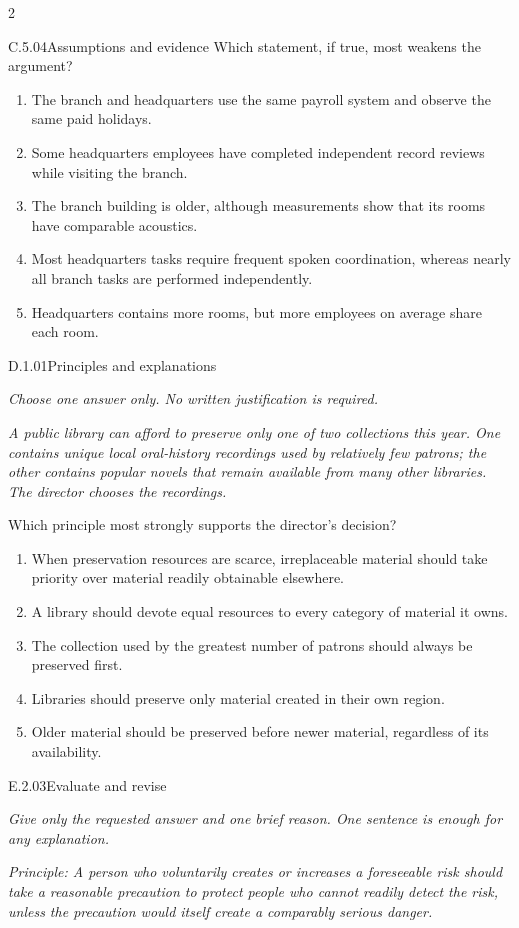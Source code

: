 \documentclass[9pt]{extarticle}
\newcommand{\choice}[1]{\item #1}
\begin{document}
\begin{multicols}{2}
\begin{DenseCoreProblem}{C.5.04}{Assumptions and evidence}
Which statement, if true, most weakens the argument?
\begin{enumerate}[label=(\alph*)]
  \choice{The branch and headquarters use the same payroll system and observe the same paid holidays.}
  \choice{Some headquarters employees have completed independent record reviews while visiting the branch.}
  \choice{The branch building is older, although measurements show that its rooms have comparable acoustics.}
  \choice{Most headquarters tasks require frequent spoken coordination, whereas nearly all branch tasks are performed independently.}
  \choice{Headquarters contains more rooms, but more employees on average share each room.}
\end{enumerate}
\end{DenseCoreProblem}
\begin{DenseCoreProblem}{D.1.01}{Principles and explanations}
{\scriptsize\textit{Choose one answer only. No written justification is required.}\par}
\emph{A public library can afford to preserve only one of two collections this year. One contains unique local oral-history recordings used by relatively few patrons; the other contains popular novels that remain available from many other libraries. The director chooses the recordings.}

Which principle most strongly supports the director's decision?
\begin{enumerate}[label=(\alph*)]
  \choice{When preservation resources are scarce, irreplaceable material should take priority over material readily obtainable elsewhere.}
  \choice{A library should devote equal resources to every category of material it owns.}
  \choice{The collection used by the greatest number of patrons should always be preserved first.}
  \choice{Libraries should preserve only material created in their own region.}
  \choice{Older material should be preserved before newer material, regardless of its availability.}
\end{enumerate}
\end{DenseCoreProblem}
\begin{DenseCoreProblem}{E.2.03}{Evaluate and revise}
{\scriptsize\textit{Give only the requested answer and one brief reason. One sentence is enough for any explanation.}\par}
\emph{Principle: A person who voluntarily creates or increases a foreseeable risk should take a reasonable precaution to protect people who cannot readily detect the risk, unless the precaution would itself create a comparably serious danger.}


\end{DenseCoreProblem}
\end{multicols}
\end{document}
